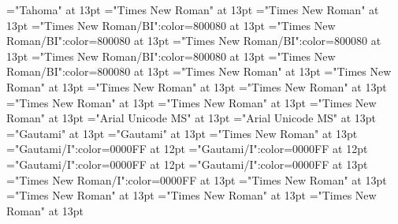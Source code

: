 \documentclass[a4paper,twoside]{article}
\begin{document}
\font\spanggofonipaxemicpronunciationggofonipaxemicspanentryletDatadicBody="Tahoma" at 13pt
\font\spanenspanentryletDatadicBody="Times New Roman" at 13pt
\font\sensespanentryletDatadicBody="Times New Roman" at 13pt
\font\grammaticalinfosensespanentryletDatadicBody="Times New Roman/BI":color=800080 at 13pt
\font\grammaticalinfoaftersensespanentryletDatadicBody="Times New Roman/BI":color=800080 at 13pt
\font\partofspeechengrammaticalinfosensespanentryletDatadicBody="Times New Roman/BI":color=800080 at 13pt
\font\spanenpartofspeechengrammaticalinfosensespanentryletDatadicBody="Times New Roman/BI":color=800080 at 13pt
\font\spanengrammaticalinfosensespanentryletDatadicBody="Times New Roman/BI":color=800080 at 13pt
\font{}="Times New Roman" at 13pt
\font\spanendefinitionensensespanentryletDatadicBody="Times New Roman" at 13pt
\font\LexSensepublishStemDefinitionPubensensespanentryletDatadicBody="Times New Roman" at 13pt
\font\spanenLexSensepublishStemDefinitionPubensensespanentryletDatadicBody="Times New Roman" at 13pt
\font\LexSensepublishStemGlossPubLcensensespanentryletDatadicBody="Times New Roman" at 13pt
\font\xitemenLexSensepublishStemGlossPubLcensensespanentryletDatadicBody="Times New Roman" at 13pt
\font\spanenxitemenLexSensepublishStemGlossPubLcensensespanentryletDatadicBody="Times New Roman" at 13pt
\font\xitemhiLexSensepublishStemGlossPubLcensensespanentryletDatadicBody="Arial Unicode MS" at 13pt
\font\spanhixitemhiLexSensepublishStemGlossPubLcensensespanentryletDatadicBody="Arial Unicode MS" at 13pt
\font\xitemteLexSensepublishStemGlossPubLcensensespanentryletDatadicBody="Gautami" at 13pt
\font\spantexitemteLexSensepublishStemGlossPubLcensensespanentryletDatadicBody="Gautami" at 13pt
\font\spansensespanentryletDatadicBody="Times New Roman" at 13pt
\font\exampleggoTeluINspansensespanentryletDatadicBody="Gautami/I":color=0000FF at 12pt
\font\examplebeforespansensespanentryletDatadicBody="Gautami/I":color=0000FF at 12pt
\font\exampleafterspansensespanentryletDatadicBody="Gautami/I":color=0000FF at 12pt
\font\spanggoTeluINexampleggoTeluINspansensespanentryletDatadicBody="Gautami/I":color=0000FF at 13pt
\font\spanenexampleggoTeluINspansensespanentryletDatadicBody="Times New Roman/I":color=0000FF at 13pt
\font\spanspansensespanentryletDatadicBody="Times New Roman" at 13pt
\font\spanspanspansensespanentryletDatadicBody="Times New Roman" at 13pt
\font\CmPossibilitypublishStemTransTypeAbbreviationPubenspanspanspansensespanentryletDatadicBody="Times New Roman" at 13pt
\font\spanenCmPossibilitypublishStemTransTypeAbbreviationPubenspanspanspansensespanentryletDatadicBody="Times New Roman" at 13pt
\end{document}
